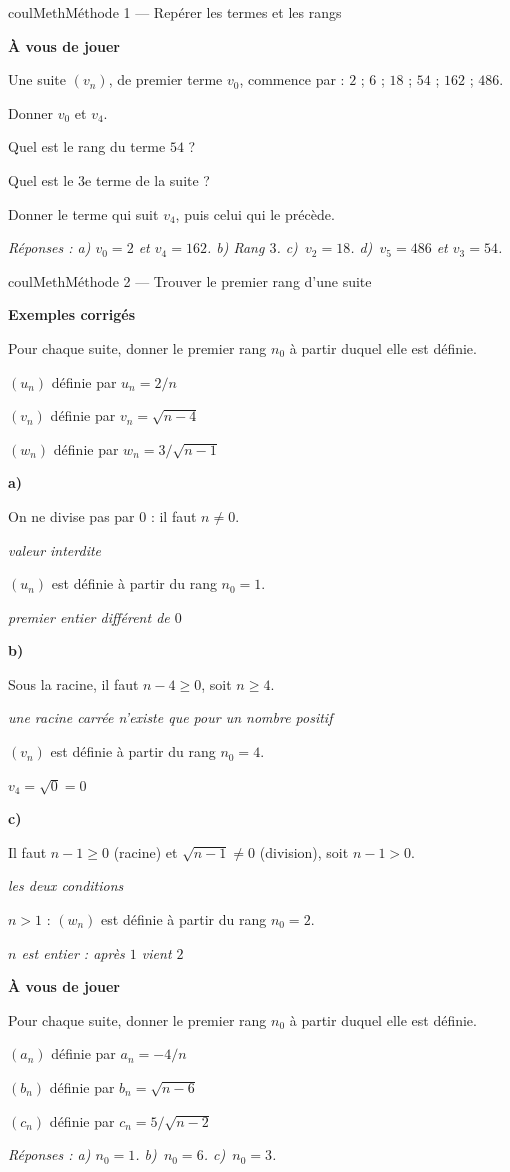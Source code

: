 \documentclass[11pt,a4paper]{article}
\makeatletter
\renewcommand{\ge}{\geqslant}
\newcounter{lycee@signet}
\newcommand{\signet}[3][]{\stepcounter{lycee@signet}%
  \edef\lycee@dest{\if\relax\detokenize{#1}\relax
    signet.\arabic{lycee@signet}\else#1\fi}%
  \hypertarget{\lycee@dest}{}\bookmark[level=#2,dest=\lycee@dest]{#3}}
\def\textsuperscript#1{#1}\def\dfrac#1#2{#1/#2}\def\frac#1#2{#1/#2}%
\newcommand{\res}[1]{#1}
\newcounter{methode}
\newenvironment{methodebox}[1][Méthode]{\stepcounter{methode}%
  \begin{boitecours}[phantom={\signet[methode-\arabic{methode}]{2}{#1}}]{coulMeth}{#1}}%
  {\end{boitecours}}
\newcommand{\etape}[1]{\par\smallskip\textbf{\color{coulMeth}#1}\par\nobreak\smallskip}
\newcommand{\reponse}[1]{\par\smallskip
  {\footnotesize\itshape\color{black!55}Réponses : #1}}
\newcommand{\explique}[2]{\par\smallskip\noindent
  \begin{minipage}[t]{0.57\linewidth}\raggedright #1\end{minipage}\hfill
  \begin{minipage}[t]{0.40\linewidth}\raggedright\leavevmode
    {\small\itshape\color{black!60}#2}\end{minipage}\par}
\newcommand{\cas}[1]{\par\smallskip\noindent\textbf{\color{coulExo}#1}\vadjust{\nobreak}}
\newenvironment{correction}{\par}{\par}
\newcommand{\etapeexemples}{\etape{Exemples corrigés}}
\makeatother
\begin{document}
\begin{methodebox}[Méthode 1 --- Repérer les termes et les rangs]
\etape{À vous de jouer}
Une suite $(v_{n})$, de premier terme $v_{0}$, commence par :
\quad $2$ ;\; $6$ ;\; $18$ ;\; $54$ ;\; $162$ ;\; $486$.
\begin{questions}[label=\alph*)]
  \item Donner $v_{0}$ et $v_{4}$.
  \item Quel est le rang du terme $54$ ?
  \item Quel est le 3\textsuperscript{e} terme de la suite ?
  \item Donner le terme qui suit $v_{4}$, puis celui qui le précède.
\end{questions}
\reponse{a) $v_{0}=2$ et $v_{4}=162$.\; b) Rang $3$.\; c)~$v_{2}=18$.\;
d)~$v_{5}=486$ et $v_{3}=54$.}
\end{methodebox}

\begin{methodebox}[Méthode 2 --- Trouver le premier rang d'une suite]
\etapeexemples
Pour chaque suite, donner le premier rang $n_{0}$ à partir duquel elle est définie.
\begin{questions}[label=\alph*)]
  \item $(u_{n})$ définie par $u_{n}=\dfrac{2}{n}$
  \item $(v_{n})$ définie par $v_{n}=\sqrt{n-4}$
  \item $(w_{n})$ définie par $w_{n}=\dfrac{3}{\sqrt{n-1}}$
\end{questions}
\begin{correction}
\cas{a)}
\explique{On ne divise pas par $0$ : il faut $n\neq 0$.}{valeur interdite}
\explique{$(u_{n})$ est définie à partir du rang $n_{0}=\res{1}$.}{premier entier
différent de $0$}
\cas{b)}
\explique{Sous la racine, il faut $n-4\ge 0$, soit $n\ge 4$.}{une racine carrée
n'existe que pour un nombre positif}
\explique{$(v_{n})$ est définie à partir du rang $n_{0}=\res{4}$.}{$v_{4}=\sqrt{0}=0$}
\cas{c)}
\explique{Il faut $n-1\ge 0$ (racine) et $\sqrt{n-1}\neq 0$ (division), soit
$n-1>0$.}{les deux conditions}
\explique{$n>1$ : $(w_{n})$ est définie à partir du rang $n_{0}=\res{2}$.}{$n$ est
entier : après $1$ vient $2$}
\end{correction}

\etape{À vous de jouer}
Pour chaque suite, donner le premier rang $n_{0}$ à partir duquel elle est définie.
\begin{questions}[label=\alph*)]
  \item $(a_{n})$ définie par $a_{n}=-\dfrac{4}{n}$
  \item $(b_{n})$ définie par $b_{n}=\sqrt{n-6}$
  \item $(c_{n})$ définie par $c_{n}=\dfrac{5}{\sqrt{n-2}}$
\end{questions}
\reponse{a) $n_{0}=1$.\; b)~$n_{0}=6$.\; c)~$n_{0}=3$.}
\end{methodebox}
\end{document}
